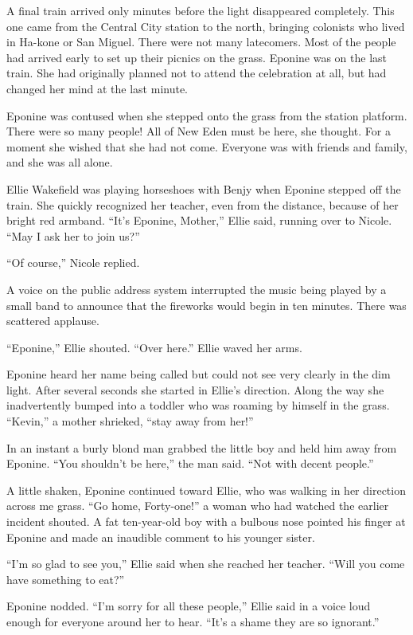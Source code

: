 \documentclass[]{article}
\begin{document}
{A final train arrived only minutes before the light disappeared completely. This one came from the Central City station to the north, bringing colonists who lived in Ha-kone or San Miguel. There were not many latecomers. Most of the people had arrived early to set up their picnics on the grass. Eponine was on the last train. She had originally planned not to attend the celebration at all, but had changed her mind at the last minute.

Eponine was contused when she stepped onto the grass from the station platform. There were so many people! All of New Eden must be here, she thought. For a moment she wished that she had not come. Everyone was with friends and family, and she was all alone.

Ellie Wakefield was playing horseshoes with Benjy when Eponine stepped off the train. She quickly recognized her teacher, even from the distance, because of her bright red armband. “It’s Eponine, Mother,” Ellie said, running over to Nicole. “May I ask her to join us?”

“Of course,” Nicole replied.

A voice on the public address system interrupted the music being played by a small band to announce that the fireworks would begin in ten minutes. There was scattered applause.

“Eponine,” Ellie shouted. “Over here.” Ellie waved her arms.

Eponine heard her name being called but could not see very clearly in the dim light. After several seconds she started in Ellie’s direction. Along the way she inadvertently bumped into a toddler who was roaming by himself in the grass. “Kevin,” a mother shrieked, “stay away from her!”

In an instant a burly blond man grabbed the little boy and held him away from Eponine. “You shouldn’t be here,” the man said. “Not with decent people.”

A little shaken, Eponine continued toward Ellie, who was walking in her direction across me grass. “Go home, Forty-one!” a woman who had watched the earlier incident shouted. A fat ten-year-old boy with a bulbous nose pointed his finger at Eponine and made an inaudible comment to his younger sister.

“I’m so glad to see you,” Ellie said when she reached her teacher. “Will you come have something to eat?”

Eponine nodded. “I’m sorry for all these people,” Ellie said in a voice loud enough for everyone around her to hear. “It’s a shame they are so ignorant.”

}
\end{document}
